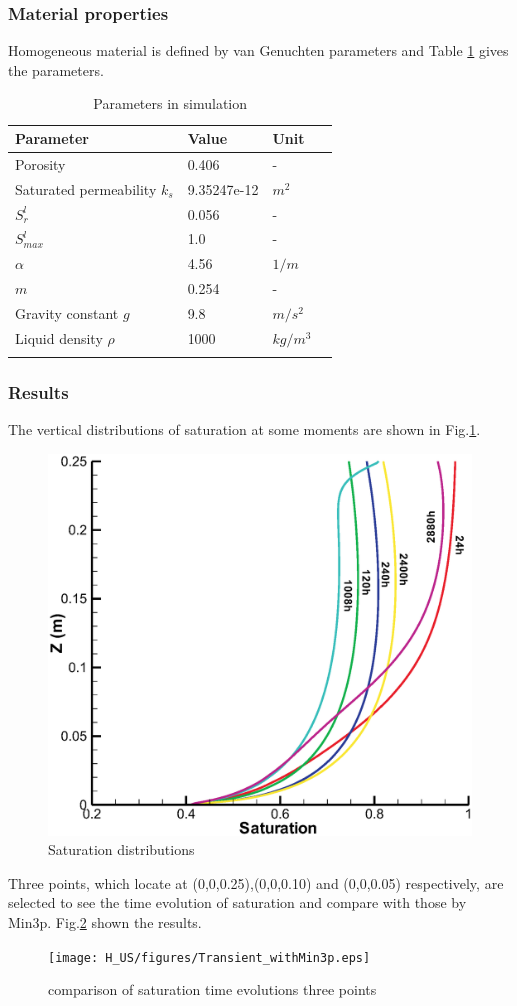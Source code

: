\subsubsection*{Material properties}
Homogeneous material is defined by van Genuchten parameters and
Table \ref{us:transientsetting} gives the parameters.
\begin{table}[H]
 \centering
 \caption{Parameters in simulation} \centering \label{us:transientsetting}
 \begin{tabular}{llll}
 \hline\hline\noalign{\smallskip}
 Parameter    & Value  &  Unit  \\ \hline
 Porosity          & 0.406   & -   \\
 Saturated permeability $k_s$ & 9.35247e-12 & $m^2$  \\
 $S_r^l$           & 0.056    &  - \\
 $S_{max}^l$        & 1.0    &  - \\
 $\alpha$           & 4.56   &  $1/m$ \\
 $m$                & 0.254      &  - \\
 Gravity constant $g$ & 9.8      &  $m/s^2$ \\
 Liquid density $\rho$ & 1000     &  $kg/m^3$ \\
\noalign{\smallskip}\hline\hline
 \end{tabular}
\end{table}
\subsubsection*{Results}
The vertical distributions of saturation at some moments are shown
in Fig.\ref{us:result-transient}.\\
%
\begin{figure} [h]
 \centering
 \includegraphics[width=0.60\columnwidth] {H_US/figures/result_transient.eps}
 \caption{Saturation distributions}
 \label{us:result-transient}
\end{figure}
%
Three points, which locate at (0,0,0.25),(0,0,0.10) and (0,0,0.05)
respectively, are selected to see the time evolution of saturation
and compare with those by Min3p. Fig.\ref{us:comparisonMin3p}
shown the results.\\
%
\begin{figure} [h]
 \centering
 \texttt{[image: H\_US/figures/Transient\_withMin3p.eps]}
 \caption{comparison of saturation time evolutions
 three points}
 \label{us:comparisonMin3p}
\end{figure}
%
